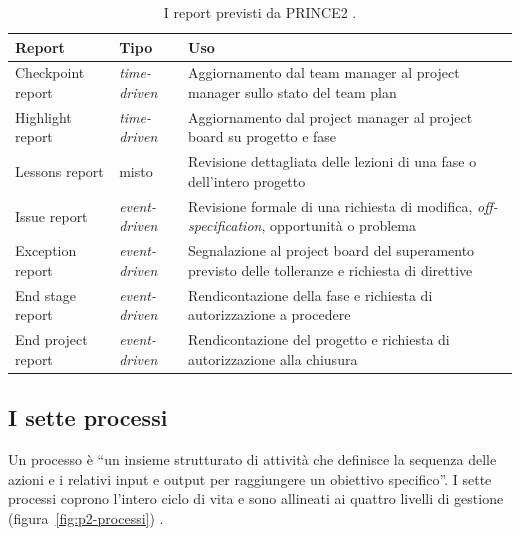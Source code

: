 \begin{table}[htbp]
\centering
\small
\caption{I report previsti da PRINCE2 \cite{prince27}.}
\label{tab:p2-report}
\begin{tabularx}{\textwidth}{@{}llX@{}}
\toprule
\textbf{Report} & \textbf{Tipo} & \textbf{Uso} \\
\midrule
Checkpoint report & \emph{time-driven} & Aggiornamento dal team manager al project manager sullo stato del team plan \\
Highlight report & \emph{time-driven} & Aggiornamento dal project manager al project board su progetto e fase \\
Lessons report & misto & Revisione dettagliata delle lezioni di una fase o dell'intero progetto \\
Issue report & \emph{event-driven} & Revisione formale di una richiesta di modifica, \emph{off-specification}, opportunit\`a o problema \\
Exception report & \emph{event-driven} & Segnalazione al project board del superamento previsto delle tolleranze e richiesta di direttive \\
End stage report & \emph{event-driven} & Rendicontazione della fase e richiesta di autorizzazione a procedere \\
End project report & \emph{event-driven} & Rendicontazione del progetto e richiesta di autorizzazione alla chiusura \\
\bottomrule
\end{tabularx}
\end{table}
\newpage


\subsection{I sette processi}

Un processo \`e ``un insieme strutturato di attivit\`a che definisce la sequenza
delle azioni e i relativi input e output per raggiungere un obiettivo
specifico''. I sette processi coprono l'intero ciclo di vita e sono allineati ai
quattro livelli di gestione (figura~\ref{fig:p2-processi}) \cite{prince27}.

